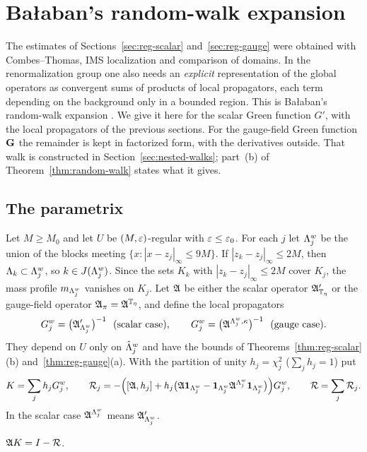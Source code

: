\section{Ba\l aban's random-walk expansion}\label{sec:random-walk}

The estimates of Sections~\ref{sec:reg-scalar} and~\ref{sec:reg-gauge} were obtained with Combes--Thomas, IMS localization and comparison of domains. In the renormalization group one also needs an \emph{explicit} representation of the global operators as convergent sums of products of local propagators, each term depending on the background only in a bounded region. This is Ba\l aban's random-walk expansion \cite{BalGreen,BalPropII,BalBackground}. We give it here for the scalar Green function $G'$, with the local propagators of the previous sections. For the gauge-field Green function $\mathbf G$ the remainder is kept in factorized form, with the derivatives outside. That walk is constructed in Section~\ref{sec:nested-walks}; part~(b) of Theorem~\ref{thm:random-walk} states what it gives.

\subsection{The parametrix}

Let $M\ge M_0$ and let $U$ be $(M,\varepsilon)$-regular with $\varepsilon\le\varepsilon_0$. For each $j$ let $\Lambda^w_j$ be the union of the blocks meeting $\{x:|x-z_j|_\infty\le9M\}$. If $|z_k-z_j|_\infty\le2M$, then $\Lambda_k\subset\Lambda^w_j$, so $k\in J(\Lambda^w_j)$. Since the sets $K_k$ with $|z_k-z_j|_\infty\le2M$ cover $K_j$, the mass profile $m_{\Lambda^w_j}$ vanishes on $K_j$. Let $\mathfrak A$ be either the scalar operator $\mathfrak A'_{\mathbb T_\eta}$ or the gauge-field operator $\mathfrak A_\pi=\mathfrak A^{\mathbb T_\eta}$, and define the local propagators
\[
G^w_j=\big(\fA'_{\Lam^w_j}\big)^{-1}\ \ \text{(scalar case)},\qquad G^w_j=\big(\fA^{\Lam^w_j,\kappa}\big)^{-1}\ \ \text{(gauge case)}.
\]
They depend on $U$ only on $\hat{\Lambda}^w_j$ and have the bounds of Theorems~\ref{thm:reg-scalar}(b) and~\ref{thm:reg-gauge}(a). With the partition of unity $h_j=\chi_j^2$ ($\sum_jh_j=1$) put
\[
K=\sum_jh_jG^w_j,\qquad \mathcal R_j=-\Big([\mathfrak A,h_j]+h_j\big(\mathfrak A\mathbf 1_{\Lambda^w_j}-\mathbf 1_{\Lambda^w_j}\mathfrak A^{\Lambda^w_j}\mathbf 1_{\Lambda^w_j}\big)\Big)G^w_j,\qquad\mathcal R=\sum_j\mathcal R_j .
\]
In the scalar case $\mathfrak A^{\Lambda^w_j}$ means $\mathfrak A'_{\Lambda^w_j}$.

\begin{lemma}\label{lem:parametrix}
$\mathfrak A K=I-\mathcal R$.
\end{lemma}

